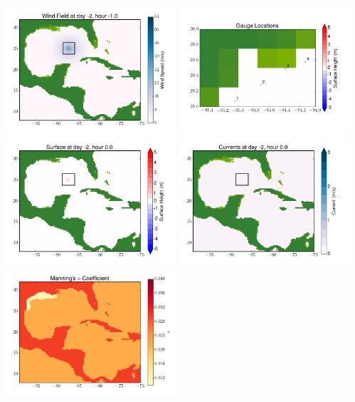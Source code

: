 \documentclass[11pt]{article}
\begin{document}
\vskip 10pt 
\includegraphics[width=0.475\textwidth]{frame0023fig9.png}
\includegraphics[width=0.475\textwidth]{frame0023fig10.png}
\vskip 10pt 
\includegraphics[width=0.475\textwidth]{frame0024fig1.png}
\includegraphics[width=0.475\textwidth]{frame0024fig2.png}
\vskip 10pt 
\includegraphics[width=0.475\textwidth]{frame0024fig3.png}
\end{document}

